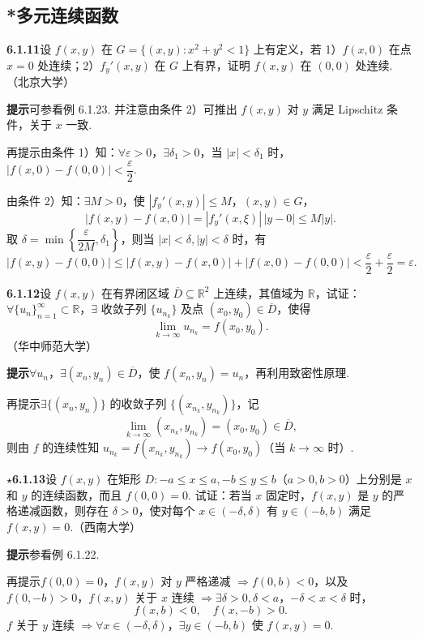 \documentclass[UTF8,12pt,a4paper,fontset=fandol]{ctexart}
\begin{document}
\subsection*{*多元连续函数}

\noindent\textbf{6.1.11}\quad 设 $f(x,y)$ 在 $G=\{(x,y):x^2+y^2<1\}$ 上有定义，若 1）$f(x,0)$ 在点 $x=0$ 处连续；2）$f_y'(x,y)$ 在 $G$ 上有界，证明 $f(x,y)$ 在 $(0,0)$ 处连续.（北京大学）

\noindent\textbf{提示}\quad 可参看例 6.1.23. 并注意由条件 2）可推出 $f(x,y)$ 对 $y$ 满足 Lipschitz 条件，关于 $x$ 一致.

再提示\quad 由条件 1）知：$\forall\varepsilon>0$，$\exists\delta_1>0$，当 $|x|<\delta_1$ 时，$|f(x,0)-f(0,0)|<\dfrac{\varepsilon}{2}$.

由条件 2）知：$\exists M>0$，使 $|f_y'(x,y)|\le M$，$(x,y)\in G$，
\[
  |f(x,y)-f(x,0)|=|f_y'(x,\xi)|\,|y-0|\le M|y|.
\]
取 $\delta=\min\left\{\dfrac{\varepsilon}{2M},\delta_1\right\}$，则当 $|x|<\delta,|y|<\delta$ 时，有
\[
  |f(x,y)-f(0,0)|\le |f(x,y)-f(x,0)|+|f(x,0)-f(0,0)|
  <\frac{\varepsilon}{2}+\frac{\varepsilon}{2}=\varepsilon.
\]

\noindent\textbf{6.1.12}\quad 设 $f(x,y)$ 在有界闭区域 $\overline D\subseteq\mathbb{R}^2$ 上连续，其值域为 $\mathbb{R}$，试证：$\forall\{u_n\}_{n=1}^\infty\subset\mathbb{R}$，$\exists$ 收敛子列 $\{u_{n_k}\}$ 及点 $(x_0,y_0)\in\overline D$，使得
\[
  \lim_{k\to\infty}u_{n_k}=f(x_0,y_0).
\]
（华中师范大学）

\noindent\textbf{提示}\quad $\forall u_n$，$\exists(x_n,y_n)\in\overline D$，使 $f(x_n,y_n)=u_n$，再利用致密性原理.

再提示\quad $\exists\{(x_n,y_n)\}$ 的收敛子列 $\{(x_{n_k},y_{n_k})\}$，记
\[
  \lim_{k\to\infty}(x_{n_k},y_{n_k})=(x_0,y_0)\in\overline D,
\]
则由 $f$ 的连续性知 $u_{n_k}=f(x_{n_k},y_{n_k})\to f(x_0,y_0)$（当 $k\to\infty$ 时）.

\noindent\textbf{$\star$6.1.13}\quad 设 $f(x,y)$ 在矩形 $D:-a\le x\le a,-b\le y\le b$（$a>0,b>0$）上分别是 $x$ 和 $y$ 的连续函数，而且 $f(0,0)=0$. 试证：若当 $x$ 固定时，$f(x,y)$ 是 $y$ 的严格递减函数，则存在 $\delta>0$，使对每个 $x\in(-\delta,\delta)$ 有 $y\in(-b,b)$ 满足 $f(x,y)=0$.（西南大学）

\noindent\textbf{提示}\quad 参看例 6.1.22.

再提示\quad $f(0,0)=0$，$f(x,y)$ 对 $y$ 严格递减 $\Rightarrow f(0,b)<0$，以及 $f(0,-b)>0$，$f(x,y)$ 关于 $x$ 连续 $\Rightarrow\exists\delta>0,\delta<a$，$-\delta<x<\delta$ 时，
\[
  f(x,b)<0,\quad f(x,-b)>0.
\]
$f$ 关于 $y$ 连续 $\Rightarrow \forall x\in(-\delta,\delta)$，$\exists y\in(-b,b)$ 使 $f(x,y)=0$.
\end{document}
